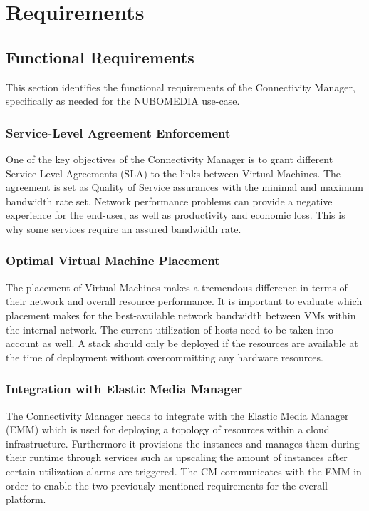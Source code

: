 \chapter{Requirements}

\section{Functional Requirements}

This section identifies the functional requirements of the Connectivity Manager, specifically as needed for the NUBOMEDIA use-case.

\subsection{Service-Level Agreement Enforcement}

One of the key objectives of the Connectivity Manager is to grant different Service-Level Agreements (SLA) to the links between Virtual Machines. The agreement is set as Quality of Service assurances with the minimal and maximum bandwidth rate set. Network performance problems can provide a negative experience for the end-user, as well as productivity and economic loss. This is why some services require an assured bandwidth rate.

\subsection{Optimal Virtual Machine Placement}

The placement of Virtual Machines makes a tremendous difference in terms of their network and overall resource performance. It is important to evaluate which placement makes for the best-available network bandwidth between VMs within the internal network. The current utilization of hosts need to be taken into account as well. A stack should only be deployed if the resources are available at the time of deployment without overcommitting any hardware resources.

\subsection{Integration with Elastic Media Manager}

The Connectivity Manager needs to integrate with the Elastic Media Manager (EMM) which is used for deploying a topology of resources within a cloud infrastructure. Furthermore it provisions the instances and manages them during their runtime through services such as upscaling the amount of instances after certain utilization alarms are triggered. The CM communicates with the EMM in order to enable the two previously-mentioned requirements for the overall platform.

